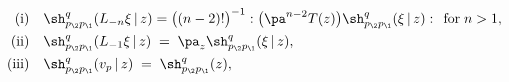 \begin{equation}\label{descdef}
\begin{aligned}
\text{(i)}\quad & \sh_{p_\2p_\1}^{q}(L_{-n}\xi\,|\,z)=\big((n-2)!\big)^{-1}
:\big(\pa^{n-2}T(z)\big)\sh_{p_\2p_\1}^{q}(\xi\,|\,z):\;\,\text{for}\;n>1,\\
\text{(ii)}\quad & \sh_{p_\2p_\1}^{q}(L_{-1}\xi\,|\,z)\;=\;\pa_z^{}
\sh_{p_\2p_\1}^{q}(\xi\,|\,z),\\
\text{(iii)}\quad & \sh_{p_\2p_\1}^{q}(v_p\,|\,z)\;=\;
\sh_{p_\2p_\1}^{q}(z),
\end{aligned}
\end{equation}

